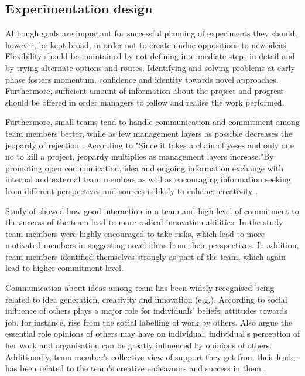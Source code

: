 \subsection{Experimentation design}
Although goals are important for successful planning of experiments they should, however, be kept broad, in order not to create undue oppositions to new ideas. Flexibility should be maintained by not defining intermediate steps in detail and by trying alternate options and routes. Identifying and solving problems at early phase fosters momentum, confidence and identity towards novel approaches. Furthermore, sufficient amount of information about the project and progress should be offered in order managers to follow and realise the work performed. \citep{quinn1985managing}

Furthermore, small teams tend to handle communication and commitment among team members better, while as few management layers as possible decreases the jeopardy of rejection \citep{quinn1985managing}. According to \citet{quinn1985managing} "Since it takes a chain of yeses and only one no to kill a project, jeopardy multiplies as management layers increase."By promoting open communication, idea and ongoing information exchange with internal and external team members as well as encouraging information seeking from different perspectives and sources is likely to enhance creativity \citep{ancona1992demography,dougherty1996sustained}. 

Study of \citet{sethi2001cross} showed how good interaction in a team and high level of commitment to the success of the team lead to more radical innovation abilities. In the study team members were highly encouraged to take risks, which lead to more motivated members in suggesting novel ideas from their perspectives. In addition, team members identified themselves strongly as part of the team, which again lead to higher commitment level. \citep{sethi2001cross}

Communication about ideas among team has been widely recognised being related to idea generation, creativity and innovation (e.g.\citep{robinson1997corporate,mumford2002social,monge1992communication,amabile1996assessing}). According to \citet{staw1989tradeoff} social influence of others plays a major role for individuals' beliefs; attitudes towards job, for instance, rise from the social labelling of work by others.  Also \citet{salancik1978social} argue the essential role opinions of others may have on individual: individual's perception of her work and organisation can be greatly influenced by opinions of others. Additionally, team member's collective view of support they get from their leader has been related to the team's creative endeavours and success in them \citep{amabile1998kill,amabile1996assessing}. 
  
